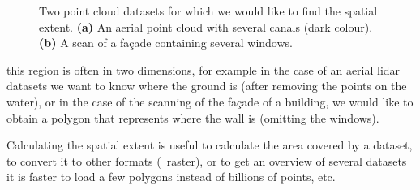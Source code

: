 \begin{figure}
\begin{subfigure}[b]{0.33\linewidth}
    \caption{}
  \end{subfigure}
\caption{Two point cloud datasets for which we would like to find the spatial extent. \textbf{(a)} An aerial point cloud with several canals (dark colour). \textbf{(b)} A scan of a façade containing several windows.}
\end{figure}
this region is often in two dimensions, for example in the case of an aerial lidar datasets we want to know where the ground is (after removing the points on the water), or in the case of the scanning of the façade of a building, we would like to obtain a polygon that represents where the wall is (omitting the windows).

%

Calculating the spatial extent is useful to calculate the area covered by a dataset, to convert it to other formats (\eg\ raster), or to get an overview of several datasets it is faster to load a few polygons instead of billions of points, etc.

%

